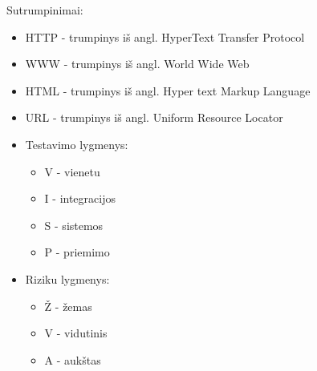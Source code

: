 \documentclass{VUMIFPSkursinis}
\begin{document}
Sutrumpinimai:

\begin{itemize}
	\item HTTP - trumpinys iš angl. HyperText Transfer Protocol
	\item WWW - trumpinys iš angl. World Wide Web
	\item HTML - trumpinys iš angl. Hyper text Markup Language
	\item URL - trumpinys iš angl. Uniform Resource Locator
	\item Testavimo lygmenys:
		\begin{itemize}
			\item V - vienetu
			\item I - integracijos
			\item S - sistemos
			\item P - priemimo
		\end{itemize}
	\item Riziku lygmenys:
		\begin{itemize}
			\item Ž - žemas
			\item V - vidutinis
			\item A - aukštas
		\end{itemize}
\end{itemize}
\end{document}
